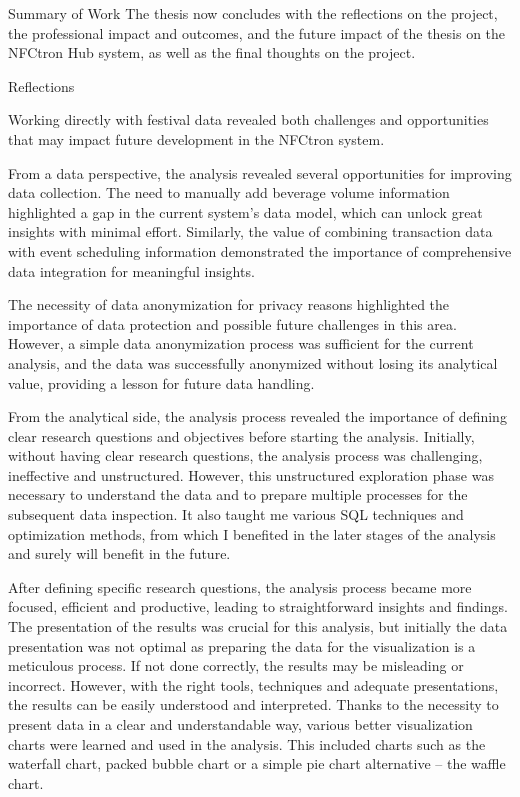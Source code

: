 \begin{section}{Summary of Work}
	The thesis now concludes with the reflections on the project, the professional impact and outcomes, and the future impact of the thesis on the NFCtron Hub system, as well as the final thoughts on the project.
\end{section}

\begin{section}{Reflections}
	\label{sec:conclusion-reflections}

	Working directly with festival data revealed both challenges and opportunities that may impact future development in the NFCtron system.

	From a data perspective, the analysis revealed several opportunities for improving data collection.
	The need to manually add beverage volume information highlighted a gap in the current system's data model, which can unlock great insights with minimal effort.
	Similarly, the value of combining transaction data with event scheduling information demonstrated the importance of comprehensive data integration for meaningful insights.

	The necessity of data anonymization for privacy reasons highlighted the importance of data protection and possible future challenges in this area.
	However, a simple data anonymization process was sufficient for the current analysis, and the data was successfully anonymized without losing its analytical value, providing a lesson for future data handling.

	From the analytical side, the analysis process revealed the importance of defining clear research questions and objectives before starting the analysis.
	Initially, without having clear research questions, the analysis process was challenging, ineffective and unstructured.
	However, this unstructured exploration phase was necessary to understand the data and to prepare multiple processes for the subsequent data inspection.
	It also taught me various SQL techniques and optimization methods, from which I benefited in the later stages of the analysis and surely will benefit in the future.

	After defining specific research questions, the analysis process became more focused, efficient and productive, leading to straightforward insights and findings.
	The presentation of the results was crucial for this analysis, but initially the data presentation was not optimal as preparing the data for the visualization is a meticulous process.
	If not done correctly, the results may be misleading or incorrect.
	However, with the right tools, techniques and adequate presentations, the results can be easily understood and interpreted.
	Thanks to the necessity to present data in a clear and understandable way, various better visualization charts were learned and used in the analysis.
	This included charts such as the waterfall chart, packed bubble chart or a simple pie chart alternative – the waffle chart.


\end{section}
